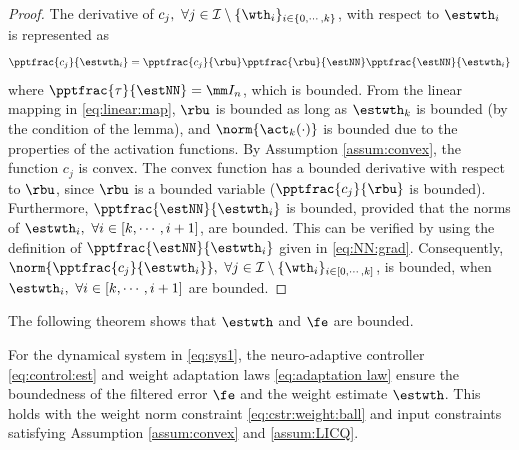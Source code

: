 \documentclass[lettersize,journal]{IEEEtran}
\begin{document}
\begin{proof}

The derivative of $c_j,\ \forall j\in\mathcal I \setminus \{\wth_i\}_{i\in\{0,\cdots,k\}}$, with respect to $\estwth_i$ is represented as
\begin{equation}
    \pptfrac{c_j}{\estwth_i} 
    = 
    \pptfrac{c_j}{\rbu} 
    \pptfrac{\rbu}{\estNN} 
    \pptfrac{\estNN}{\estwth_i}
\end{equation}
where $\pptfrac{\tau}{\estNN}=\mm I_n$, which is bounded. 
From the linear mapping in \eqref{eq:linear:map}, $\rbu$ is bounded as long as $\estwth_k$ is bounded (by the condition of the lemma), and $\norm{\act_k(\cdot)}$ is bounded due to the properties of the activation functions. 
By Assumption \ref{assum:convex}, the function $c_j$ is convex. 
The convex function has a bounded derivative with respect to $\rbu$, since $\rbu$ is a bounded variable (\ie $\pptfrac{c_j}{\rbu}$ is bounded). 
Furthermore, $\pptfrac{\estNN}{\estwth_i}$ is bounded, provided that the norms of $\estwth_i,\ \forall i \in[k,\cdots,i+1]$, are bounded. 
This can be verified by using the definition of $\pptfrac{\estNN}{\estwth_i}$ given in \eqref{eq:NN:grad}.
Consequently, $\norm{\pptfrac{c_j}{\estwth_i}},\ \forall j\in\mathcal I \setminus \{\wth_i\}_{i\in[0,\cdots,k]}$, is bounded, when $\estwth_i,\ \forall i\in [k,\cdots,i+1]$ are bounded.

\end{proof}

The following theorem shows that $\estwth$ and $\fe$ are bounded.

\begin{theorem}
    For the dynamical system in \eqref{eq:sys1}, the neuro-adaptive controller \eqref{eq:control:est} and weight adaptation laws \eqref{eq:adaptation law} ensure the boundedness of the filtered error $\fe$ and the weight estimate $\estwth$. 
    This holds with the weight norm constraint \eqref{eq:cstr:weight:ball} and input constraints satisfying Assumption \ref{assum:convex} and \ref{assum:LICQ}.
\end{theorem}
\end{document}
